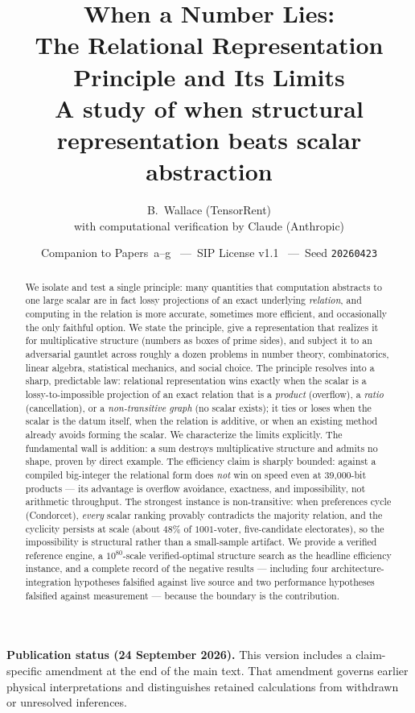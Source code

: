 \documentclass[11pt]{article}
\title{\textbf{When a Number Lies:\\
The Relational Representation Principle and Its Limits}\\[4pt]
\large A study of when structural representation beats scalar abstraction}
\author{B.\ Wallace \quad (TensorRent)\\
\small with computational verification by Claude (Anthropic)}
\date{\small Companion to Papers~a--g \ ---\ SIP License v1.1 \ ---\ Seed \texttt{20260423}}
\begin{document}
\maketitle

\begin{abstract}
We isolate and test a single principle: many quantities that computation abstracts to one large scalar are
in fact lossy projections of an exact underlying \emph{relation}, and computing in the relation is more
accurate, sometimes more efficient, and occasionally the only faithful option. We state the principle,
give a representation that realizes it for multiplicative structure (numbers as boxes of prime sides), and
subject it to an adversarial gauntlet across roughly a dozen problems in number theory, combinatorics,
linear algebra, statistical mechanics, and social choice. The principle resolves into a sharp, predictable
law: relational representation wins exactly when the scalar is a lossy-to-impossible projection of an exact
relation that is a \emph{product} (overflow), a \emph{ratio} (cancellation), or a \emph{non-transitive
graph} (no scalar exists); it ties or loses when the scalar is the datum itself, when the relation is
additive, or when an existing method already avoids forming the scalar. We characterize the limits
explicitly. The fundamental wall is addition: a sum destroys multiplicative structure and admits no shape,
proven by direct example. The efficiency claim is sharply bounded: against a compiled big-integer the
relational form does \emph{not} win on speed even at 39{,}000-bit products --- its advantage is overflow
avoidance, exactness, and impossibility, not arithmetic throughput. The strongest instance is non-transitive:
when preferences cycle (Condorcet), \emph{every} scalar ranking provably contradicts the majority relation,
and the cyclicity persists at scale (about $48\%$ of $1001$-voter, five-candidate electorates), so the
impossibility is structural rather than a small-sample artifact. We provide a verified reference engine, a
$10^{80}$-scale verified-optimal structure search as the headline efficiency instance, and a complete record
of the negative results --- including four architecture-integration hypotheses falsified against live source
and two performance hypotheses falsified against measurement --- because the boundary is the contribution.
\end{abstract}
\par\smallskip\noindent\textbf{Publication status (24 September 2026).}
This version includes a claim-specific amendment at the end of the main text.
That amendment governs earlier physical interpretations and distinguishes
retained calculations from withdrawn or unresolved inferences.\par\smallskip
\end{document}
